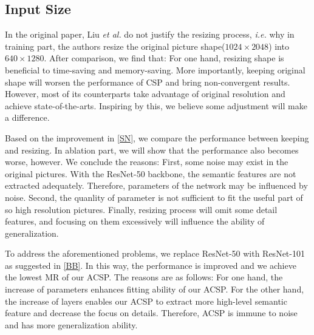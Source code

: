 \documentclass[twocolumn]{article}
\begin{document}
\subsection{Input Size}\label{is}
In the original paper\cite{liu2019high}, Liu \textit{et al.} do not justify the resizing process, \textit{i.e.} why in training part, the authors resize the original picture shape($1024 \times 2048$) into $640 \times 1280$. After comparison, we find that: For one hand, resizing shape is beneficial to time-saving and memory-saving. More importantly, keeping original shape will worsen the performance of CSP\cite{liu2019high} and bring non-convergent results. However, most of its counterparts take advantage of original resolution and achieve state-of-the-arts. Inspiring by this, we believe some adjustment will make a difference.\par 
Based on the improvement in \ref{SN}, we compare the performance between keeping and resizing. In ablation part, we will show that the performance also becomes worse, however. We conclude the reasons: First, some noise may exist in the original pictures. With the ResNet-50 backbone, the semantic features are not extracted adequately. Therefore, parameters of the network may be influenced by noise. Second, the quanlity of parameter is not sufficient to fit the useful part of so high resolution pictures. Finally, resizing process will omit some detail features, and focusing on them excessively will influence the ability of generalization.\par 
To address the aforementioned problems, we replace ResNet-50 with ResNet-101 as suggested in \ref{BB}. In this way, the performance is improved and we achieve the lowest MR of our ACSP. The reasons are as follows: For one hand, the increase of parameters enhances fitting ability of our ACSP. For the other hand, the increase of layers enables our ACSP to extract more high-level semantic feature and decrease the focus on details. Therefore, ACSP is immune to noise and has more generalization ability.
\end{document}
